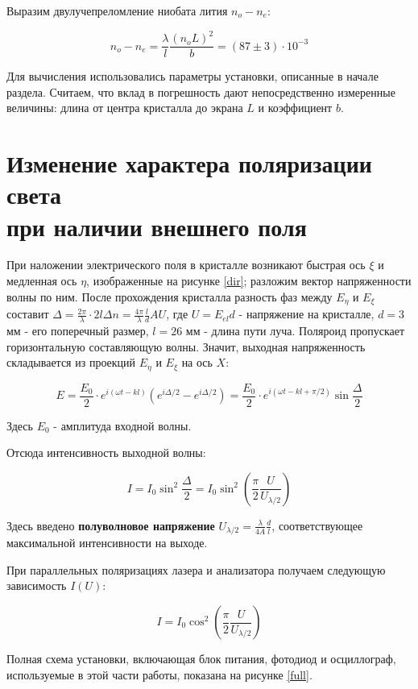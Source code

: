 \documentclass[a4paper, 12pt]{article}%
\begin{document}
	Выразим двулучепреломление ниобата лития $n_o - n_e$:
	
	\[ n_o - n_e = \frac{\lambda}{l}\frac{(n_oL)^2}{b} = (87 \pm 3) \cdot 10^{-3} \]
	
	Для вычисления использовались параметры установки, описанные в начале раздела. Считаем, что вклад в погрешность дают непосредственно измеренные величины: длина от центра кристалла до экрана $L$ и коэффициент $b$.
	
	\section{Изменение характера поляризации света \\ при наличии внешнего поля}
	
	При наложении электрического поля в кристалле возникают быстрая ось $\xi$ и медленная ось $\eta$, изображенные на рисунке \ref{dir}; разложим вектор напряженности волны по ним. После прохождения кристалла разность фаз между $E_\eta$ и $E_\xi$ составит $\Delta = \frac{2\pi}{\lambda} \cdot2l\Delta n = \frac{4\pi}{\lambda} \frac{l}{d} AU$, где $U = E_{el}d$ - напряжение на кристалле, $d = 3$ мм - его поперечный размер, $l = 26$ мм - длина пути луча. Поляроид пропускает горизонтальную составляющую волны. Значит, выходная напряженность складывается из проекций $E_\eta$ и $E_\xi$ на ось $X$:
	
	\[ E = \frac{E_0}{2} \cdot e^{i(\omega t - kl)} (e^{i\Delta/2} - e^{i\Delta/2}) = \frac{E_0}{2} \cdot  e^{i(\omega t - kl + \pi/2)} \sin\frac{\Delta}{2} \]
	
	Здесь $E_0$ - амплитуда входной волны.
	
	Отсюда интенсивность выходной волны: 
	
	\begin{equation}
		I = I_0 \sin^2\frac{\Delta}{2} = I_0\sin^2 \left(\frac{\pi}{2}\frac{U}{U_{\lambda/2}}\right) 
	\end{equation}
	
	Здесь введено \textbf{полуволновое напряжение} $U_{\lambda/2} = \frac{\lambda}{4A}\frac{d}{l}$, соответствующее максимальной интенсивности на выходе.
	
	При параллельных поляризациях лазера и анализатора получаем следующую зависимость $I(U)$:
	
	\begin{equation}
		I = I_0 \cos^2\left(\frac{\pi}{2}\frac{U}{U_{\lambda/2}}\right)
	\end{equation} 
	
	Полная схема установки, включающая блок питания, фотодиод и осциллограф, используемые в этой части работы, показана на рисунке \ref{full}. 
	
\end{document}
